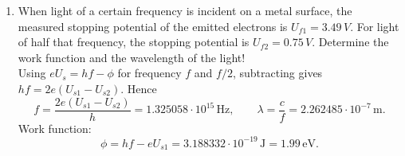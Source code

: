 \documentclass[a4paper,12pt]{letter}
\begin{document}
\begin{enumerate}
\item When light of a certain frequency is incident on a metal surface, the measured stopping potential of the emitted electrons is $ U_{f1} = 3.49\,V$.  For light of half that frequency, the stopping potential is $ U_{f2} = 0.75 \,V $.   Determine the work function and the wavelength of the light!\\

 Using $eU_{s}=hf-\phi$ for frequency $f$ and $f/2$,
subtracting gives $hf=2e(U_{s1}-U_{s2})$. Hence
$$ f=\frac{2e(U_{s1}-U_{s2})}{h}=1.325058\cdot 10^{15}\,\text{Hz}, \qquad \lambda=\frac{c}{f}=2.262485\cdot 10^{-7}\,\text{m}. $$
Work function: 
$$ \phi=hf-eU_{s1}=3.188332\cdot 10^{-19}\,\text{J}=1.99\,\text{eV}. $$

\end{enumerate}

\bigskip


\vfill
\end{document}
